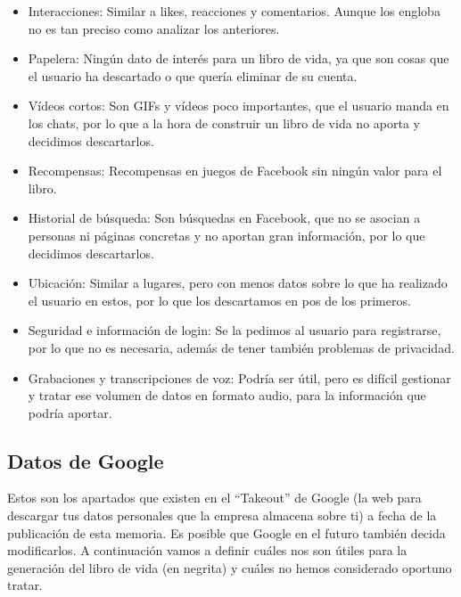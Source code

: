 \begin{itemize}
	\item Interacciones: Similar a likes, reacciones y comentarios. Aunque los engloba no es tan preciso como analizar los anteriores.
	
	\item Papelera: Ningún dato de interés para un libro de vida, ya que son cosas que el usuario ha descartado o que quería eliminar de su cuenta.
	
	\item Vídeos cortos: Son GIFs y vídeos poco importantes, que el usuario manda en los chats, por lo que a la hora de construir un libro de vida no aporta y decidimos descartarlos.
	
	\item Recompensas: Recompensas en juegos de Facebook sin ningún valor para el libro.
	
	\item Historial de búsqueda: Son búsquedas en Facebook, que no se asocian a personas ni páginas concretas y no aportan gran información, por lo que decidimos descartarlos.
	
	\item Ubicación: Similar a lugares, pero con menos datos sobre lo que ha realizado el usuario en estos, por lo que los descartamos en pos de los primeros.
	
	\item Seguridad e información de login: Se la pedimos al usuario para registrarse, por lo que no es necesaria, además de tener también problemas de privacidad.
	
	\item Grabaciones y transcripciones de voz: Podría ser útil, pero es difícil gestionar y tratar ese volumen de datos en formato audio, para la información que podría aportar.
	
\end{itemize}

\subsection{Datos de Google}

Estos son los apartados que existen en el ``Takeout'' de Google (la web para descargar tus datos personales que la empresa almacena sobre ti) a fecha de la publicación de esta memoria. Es posible que Google en el futuro también decida modificarlos. A continuación vamos a definir cuáles nos son útiles para la generación del libro de vida (en negrita) y cuáles no hemos considerado oportuno tratar.

